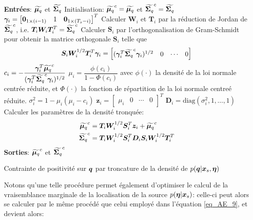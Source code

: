 \begin{algorithm}
\begin{algorithmic}
	\State \textbf{Entrées}: ${\widetilde{\bm{\mu}_q}}$ et ${\widetilde{\bm{\Sigma}_q}}$
	\State Initialisation: ${\widetilde{\bm{\mu}_q}}^c={\widetilde{\bm{\mu}_q}}$ et ${\widetilde{\bm{\Sigma}_q}}^c={\widetilde{\bm{\Sigma}_q}}$
		\State ${\bm \gamma}_i=\begin{bmatrix}{\bf 0}_{1\times (i-1)} & 1  & {\bf 0}_{1\times (T_s-i)}\end{bmatrix}^T$
		\State Calculer ${\bm W}_i$ et ${\bm T}_i$ par la réduction de Jordan de ${\widetilde{\bm{\Sigma}_q}}^c$, i.e. ${\bm T}_i {\bm W}_i {\bm T}_i^T={\widetilde{\bm{\Sigma}_q}}^c$
		\State Calculer ${\bm S}_i$ par l'orthogonalisation de Gram-Schmidt pour obtenir la matrice orthogonale ${\bm S}_i$ telle que $${\bm S}_i {\bm W}_i^{1/2} {\bm T}_i^T {\bm \gamma}_i=\begin{bmatrix}
		({\bm \gamma}_i^T {\widetilde{\bm{\Sigma}_q}}^c {\bm \gamma}_i)^{1/2} & 0 & \cdots & 0 
		\end{bmatrix} $$
		 $c_i=-\dfrac{{\bm \gamma}_i^T {\widetilde{\bm{\mu}_q}}^c}{({\bm \gamma}_i^T {\widetilde{\bm{\Sigma}_q}}^c {\bm \gamma}_i)^{1/2}}$
		 \State $\mu_i=\dfrac{\phi(c_i)}{1-\Phi(c_i)}$ avec $\phi(\cdot)$ la densité de la loi normale centrée réduite, et $\Phi(\cdot)$ la fonction de répartition de la loi normale centreé réduite.
		 \State $\sigma^2_i=1-\mu_i(\mu_i-c_i)$
		 \State ${\bm z}_i=\begin{bmatrix}\mu_i & 0 & \cdots & 0 \end{bmatrix}^T$
		 \State ${\bm D}_i=\text{diag}(\sigma^2_i,1,\ldots,1)$
		\State Calculer les paramètres de la densité tronquée:
		\State \begin{align*}
		\begin{split}
		{\widetilde{\bm{\mu}_q}}^c&={\bm T}_i {\bm W}_i^{1/2} {\bm S}_i ^T{\bm z}_i + {\widetilde{\bm{\mu}_q}}^c\\
		{\widetilde{\bm{\Sigma}_q}}^c&={\bm T}_i {\bm W}_i^{1/2} {\bm S}_i^T {\bm D}_i  {\bm S}_i {\bm W}_i^{1/2} {\bm T}_i ^T \\
		\end{split}
		\end{align*}
	\EndFor
	\State \textbf{Sorties}: ${\widetilde{\bm{\mu}_q}}^c$ et ${\widetilde{\bm{\Sigma}_q}}^c$
	\end{algorithmic}
	\caption{Contrainte de positivité sur ${\bm{q}}$ par troncature de la densité de $p({\bm{q}} | {\bm{x}_s}, {\bm{\eta}})$}
	\label{algo_PCO}
\end{algorithm}

Notons qu'une telle procédure permet également d'optimiser le calcul de la vraisemblance marginale de la localisation de la source $p({\bm{\eta}} | {\bm{x}_s})$: celle-ci peut alors se calculer par le même procédé que celui employé dans l'équation \eqref{eq_AE_9}, et devient alors:

